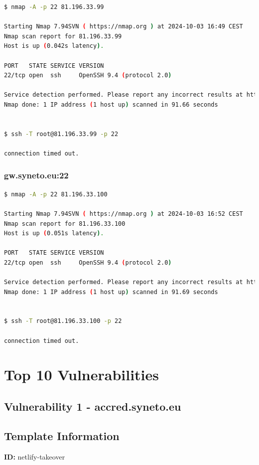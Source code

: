 \begin{lstlisting}[language=bash,breaklines=true,postbreak=\mbox{\textcolor{red}{$\hookrightarrow$}\space}]
$ nmap -A -p 22 81.196.33.99

Starting Nmap 7.94SVN ( https://nmap.org ) at 2024-10-03 16:49 CEST
Nmap scan report for 81.196.33.99
Host is up (0.042s latency).

PORT   STATE SERVICE VERSION
22/tcp open  ssh     OpenSSH 9.4 (protocol 2.0)

Service detection performed. Please report any incorrect results at https://nmap.org/submit/ .
Nmap done: 1 IP address (1 host up) scanned in 91.66 seconds


$ ssh -T root@81.196.33.99 -p 22

connection timed out.\end{lstlisting}

\subsection*{gw.syneto.eu:22}

\begin{lstlisting}[language=bash,breaklines=true,postbreak=\mbox{\textcolor{red}{$\hookrightarrow$}\space}]
$ nmap -A -p 22 81.196.33.100

Starting Nmap 7.94SVN ( https://nmap.org ) at 2024-10-03 16:52 CEST
Nmap scan report for 81.196.33.100
Host is up (0.051s latency).

PORT   STATE SERVICE VERSION
22/tcp open  ssh     OpenSSH 9.4 (protocol 2.0)

Service detection performed. Please report any incorrect results at https://nmap.org/submit/ .
Nmap done: 1 IP address (1 host up) scanned in 91.69 seconds


$ ssh -T root@81.196.33.100 -p 22

connection timed out.\end{lstlisting}

\chapter{Top 10 Vulnerabilities}

\section*{Vulnerability 1 - accred.syneto.eu}

\section*{Template Information}
\textbf{ID:} netlify-takeover


